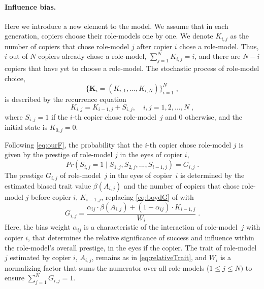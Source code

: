 \documentclass[12pt]{extarticle}
\let\vec\mathbf
\begin{document}
\paragraph{Influence bias.}
Here we introduce a new element to the model.
We assume that in each generation, copiers choose their role-models one by one.
We denote $K_{i,j}$ as the number of copiers that chose role-model $j$ after copier $i$ chose a role-model. Thus, $i$ out of $N$ copiers already chose a role-model, $\sum_{j=1}^N{K_{i,j}} = i$, and there are $N-i$ copiers that have yet to choose a role-model.
The stochastic process of role-model choice, 
\begin{equation} \label{eq:process}
\big\{\vec{K}_i = (K_{i,1}, \ldots, K_{i,N}) \big\}_{i=1}^N \;,
\end{equation}
is described by the recurrence equation
\begin{equation} \label{eq:recurrence}
K_{i,j} = K_{i-1,j} + S_{i,j}, \quad i,j=1,2,\ldots,N \;,
\end{equation}
where $S_{i,j}=1$ if the $i$-th copier chose role-model~$j$ and 0 otherwise, and the initial state is $K_{0,j}=0$.

Following \cref{eq:ourF}, the probability that the $i$-th copier chose role-model $j$ is given by the prestige of role-model $j$ in the eyes of copier $i$,
\begin{equation}\label{eq:recPrestige}
Pr(S_{i,j}=1 \mid S_{1,j},S_{2,j},...,S_{i-1,j}) = G_{i,j} \;.
\end{equation}
The prestige $G_{i,j}$ of role-model~$j$ in the eyes of copier~$i$ is determined by the estimated biased trait value $\beta(A_{i,j})$ and the number of copiers that chose role-model $j$ before copier $i$, $K_{i-1,j}$, replacing \cref{eq:boydG} of \citet{evolutionBook} with
\begin{equation}\label{eq:prestige}
G_{i,j} = \frac{\alpha_{ij} \cdot \beta(A_{i,j}) + (1-\alpha_{ij}) \cdot K_{i-1,j}}{W_i} \;.
\end{equation}
Here, the bias weight $\alpha_{ij}$ is a characteristic of the interaction of role-model~$j$ with copier $i$, that determines the relative significance of success and influence within the role-model's overall prestige, in the eyes if the copier. The trait of role-model $j$ estimated by copier $i$, $A_{i,j}$, remains as in \cref{eq:relativeTrait}, and $W_i$ is a normalizing factor that sums the numerator over all role-models ($1\le j \le N)$ to ensure $\sum_{j=1}^{N}{G_{i,j}}=1$.
\end{document}
